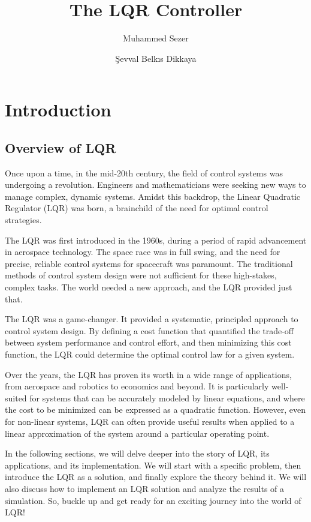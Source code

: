 \documentclass[11pt,twocolumn,twoside,lineno]{pnas-new}
\title{The LQR Controller}
\author[a,b]{Muhammed Sezer}
\author[a,b]{Şevval Belkıs Dikkaya}
\affil[a]{\href{https://www.metu.edu.tr/}{Middle East Technical University}}
\affil[b]{Orion Robotics Ltd.}
\begin{document}
\maketitle
\thispagestyle{firststyle}


\section{Introduction}
\subsection{Overview of LQR}

Once upon a time, in the mid-20th century, the field of control systems was undergoing a revolution. Engineers and mathematicians were seeking new ways to manage complex, dynamic systems. Amidst this backdrop, the Linear Quadratic Regulator (LQR) was born, a brainchild of the need for optimal control strategies.

The LQR was first introduced in the 1960s, during a period of rapid advancement in aerospace technology. The space race was in full swing, and the need for precise, reliable control systems for spacecraft was paramount. The traditional methods of control system design were not sufficient for these high-stakes, complex tasks. The world needed a new approach, and the LQR provided just that.

The LQR was a game-changer. It provided a systematic, principled approach to control system design. By defining a cost function that quantified the trade-off between system performance and control effort, and then minimizing this cost function, the LQR could determine the optimal control law for a given system.

Over the years, the LQR has proven its worth in a wide range of applications, from aerospace and robotics to economics and beyond. It is particularly well-suited for systems that can be accurately modeled by linear equations, and where the cost to be minimized can be expressed as a quadratic function. However, even for non-linear systems, LQR can often provide useful results when applied to a linear approximation of the system around a particular operating point.

In the following sections, we will delve deeper into the story of LQR, its applications, and its implementation. We will start with a specific problem, then introduce the LQR as a solution, and finally explore the theory behind it. We will also discuss how to implement an LQR solution and analyze the results of a simulation. So, buckle up and get ready for an exciting journey into the world of LQR!
\end{document}
